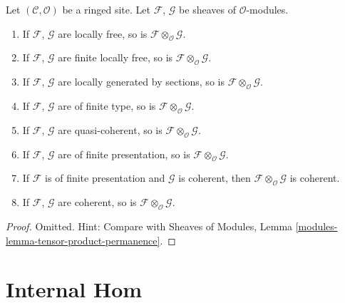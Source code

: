 \begin{lemma}
\label{lemma-tensor-product-permanence}
Let $(\mathcal{C}, \mathcal{O})$ be a ringed site.
Let $\mathcal{F}$, $\mathcal{G}$ be sheaves of $\mathcal{O}$-modules.
\begin{enumerate}
\item If $\mathcal{F}$, $\mathcal{G}$ are locally free,
so is $\mathcal{F} \otimes_\mathcal{O} \mathcal{G}$.
\item If $\mathcal{F}$, $\mathcal{G}$ are finite locally free,
so is $\mathcal{F} \otimes_\mathcal{O} \mathcal{G}$.
\item If $\mathcal{F}$, $\mathcal{G}$ are locally generated
by sections, so is $\mathcal{F} \otimes_\mathcal{O} \mathcal{G}$.
\item If $\mathcal{F}$, $\mathcal{G}$ are of finite type,
so is $\mathcal{F} \otimes_\mathcal{O} \mathcal{G}$.
\item If $\mathcal{F}$, $\mathcal{G}$ are quasi-coherent,
so is $\mathcal{F} \otimes_\mathcal{O} \mathcal{G}$.
\item If $\mathcal{F}$, $\mathcal{G}$ are of finite presentation,
so is $\mathcal{F} \otimes_\mathcal{O} \mathcal{G}$.
\item If $\mathcal{F}$ is of finite presentation and $\mathcal{G}$ is coherent,
then $\mathcal{F} \otimes_\mathcal{O} \mathcal{G}$ is coherent.
\item If $\mathcal{F}$, $\mathcal{G}$ are coherent,
so is $\mathcal{F} \otimes_\mathcal{O} \mathcal{G}$.
\end{enumerate}
\end{lemma}

\begin{proof}
Omitted. Hint: Compare with
Sheaves of Modules, Lemma \ref{modules-lemma-tensor-product-permanence}.
\end{proof}



\section{Internal Hom}
\label{section-internal-hom}

